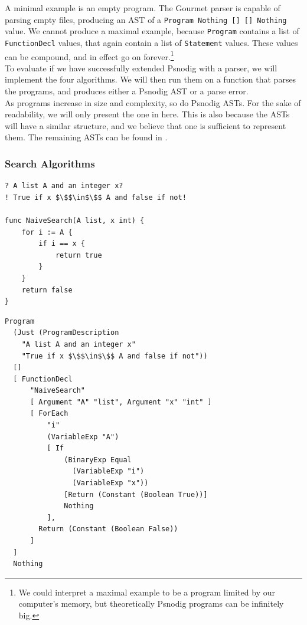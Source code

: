 A minimal example is an empty program. The Gourmet parser is capable of parsing empty files, producing an AST of a \texttt{Program Nothing [] [] Nothing} value. We cannot produce a maximal example, because \texttt{Program} contains a list of \texttt{FunctionDecl} values, that again contain a list of \texttt{Statement} values. These values can be compound, and in effect go on forever.\footnote{We could interpret a maximal example to be a program limited by our computer’s memory, but theoretically Psnodig programs can be infinitely big.} \\

To evaluate if we have successfully extended Psnodig with a parser, we will implement the four algorithms. We will then run them on a function that parses the programs, and produces either a Psnodig AST or a parse error. \\

As programs increase in size and complexity, so do Psnodig ASTs. For the sake of readability, we will only present the one in  here. This is also because the ASTs will have a similar structure, and we believe that one is sufficient to represent them. The remaining ASTs can be found in .

\subsubsection{Search Algorithms}

\begin{lstlisting}[caption={Naive search implementation in Gourmet.}, captionpos=b, label={naiveSearchGourmet}]
? A list A and an integer x?
! True if x $\$$\in$\$$ A and false if not!

func NaiveSearch(A list, x int) {
    for i := A {
        if i == x {
            return true
        }
    }
    return false
}
\end{lstlisting}

\begin{lstlisting}[caption={The Psnodig AST generated by parsing \Cref{naiveSearchGourmet}.}, captionpos=b, label={naiveSearchAST}]
Program
  (Just (ProgramDescription
    "A list A and an integer x"
    "True if x $\$$\in$\$$ A and false if not"))
  []
  [ FunctionDecl
      "NaiveSearch"
      [ Argument "A" "list", Argument "x" "int" ]
      [ ForEach
          "i"
          (VariableExp "A")
          [ If
              (BinaryExp Equal
                (VariableExp "i")
                (VariableExp "x"))
              [Return (Constant (Boolean True))]
              Nothing
          ],
        Return (Constant (Boolean False))
      ]
  ]
  Nothing
\end{lstlisting}

